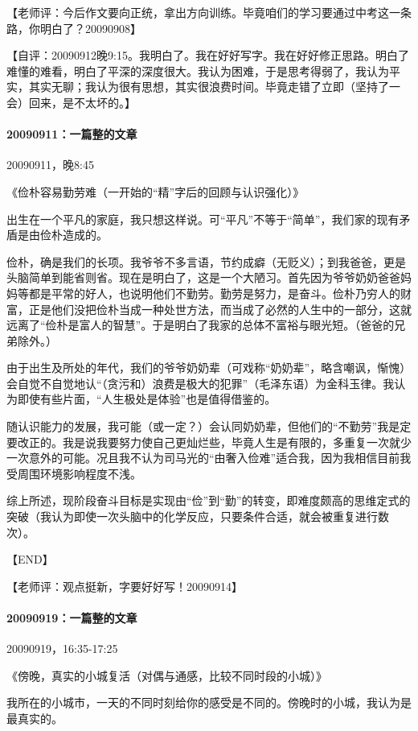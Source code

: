 \documentclass[UTF8]{Diaries}
\begin{document}
【老师评：今后作文要向正统，拿出方向训练。毕竟咱们的学习要通过中考这一条路，你明白了？20090908】

【自评：20090912晚9:15。我明白了。我在好好写字。我在好好修正思路。明白了难懂的难看，明白了平深的深度很大。我认为困难，于是思考得弱了，我认为平实，其实无聊；我认为很有思想，其实很浪费时间。毕竟走错了立即（坚持了一会）回来，是不太坏的。】


\paragraph{20090911：一篇整的文章}
20090911，晚8:45

《俭朴容易勤劳难（一开始的“精”字后的回顾与认识强化）》

出生在一个平凡的家庭，我只想这样说。可“平凡”不等于“简单”，我们家的现有矛盾是由俭朴造成的。

俭朴，确是我们的长项。我爷爷不多言语，节约成癖（无贬义）；到我爸爸，更是头脑简单到能省则省。现在是明白了，这是一个大陋习。首先因为爷爷奶奶爸爸妈妈等都是平常的好人，也说明他们不勤劳。勤劳是努力，是奋斗。俭朴乃穷人的财富，正是他们没把俭朴当成一种处世方法，而当成了必然的人生中的一部分，这就远离了“俭朴是富人的智慧”。于是明白了我家的总体不富裕与眼光短。（爸爸的兄弟除外。）

由于出生及所处的年代，我们的爷爷奶奶辈（可戏称“奶奶辈”，略含嘲讽，惭愧）会自觉不自觉地认“（贪污和）浪费是极大的犯罪”（毛泽东语）为金科玉律。我认为即使有些片面，“人生极处是体验”也是值得借鉴的。

随认识能力的发展，我可能（或一定？）会认同奶奶辈，但他们的“不勤劳”我是定要改正的。我是说我要努力使自己更灿烂些，毕竟人生是有限的，多重复一次就少一次意外的可能。况且我不认为司马光的“由奢入俭难”适合我，因为我相信目前我受周围环境影响程度不浅。

综上所述，现阶段奋斗目标是实现由“俭”到“勤”的转变，即难度颇高的思维定式的突破（我认为即使一次头脑中的化学反应，只要条件合适，就会被重复进行数次）。

【END】

【老师评：观点挺新，字要好好写！20090914】


\paragraph{20090919：一篇整的文章}

20090919，16:35-17:25

《傍晚，真实的小城复活（对偶与通感，比较不同时段的小城）》

我所在的小城市，一天的不同时刻给你的感受是不同的。傍晚时的小城，我认为是最真实的。
\end{document}
